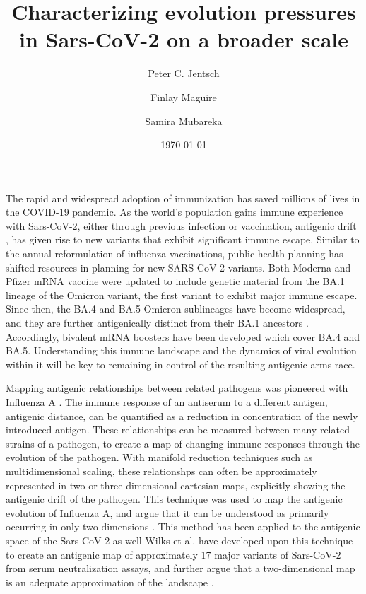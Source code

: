 \documentclass{article}
\title{Characterizing evolution pressures in Sars-CoV-2 on a broader scale}
\author[1,4]{Peter C. Jentsch}
\author[3,5]{Finlay Maguire}
\author[1,2]{Samira Mubareka}
\affil[1]{Sunnybrook Research Institute, Toronto, Canada}
\affil[2]{University of Toronto, Toronto, Canada}
\affil[3]{Dalhousie University, Halifax, Canada}
\affil[4]{Simon Fraser University, Burnaby, Canada}
\affil[5]{Shared Hospital Laboratory, Toronto, Canada}
\date{\today}                     %
\begin{document}
The rapid and widespread adoption of immunization has saved millions of lives in the COVID-19 pandemic.
As the world's population gains immune experience with Sars-CoV-2, either through previous infection or vaccination, antigenic drift \cite{yewdellAntigenicDriftUnderstanding2021}, has given rise to new variants that exhibit significant immune escape.
Similar to the annual reformulation of influenza vaccinations, public health planning has shifted resources in planning for new SARS-CoV-2 variants.
Both Moderna and Pfizer mRNA vaccine were updated to include genetic material from the BA.1 lineage of the Omicron variant, the first variant to exhibit major immune escape.
Since then, the BA.4 and BA.5 Omicron sublineages have become widespread, and they are further antigenically distinct from their BA.1 ancestors \cite{cao2022ba}.
Accordingly, bivalent mRNA boosters have been developed which cover BA.4 and BA.5. 
Understanding this immune landscape and the dynamics of viral evolution within it will be key to remaining in control of the resulting antigenic arms race.


Mapping antigenic relationships between related pathogens was pioneered with Influenza A \cite{lapedesGeometryShapeSpace2001}. 
The immune response of an antiserum to a different antigen, antigenic distance, can be quantified as a reduction in concentration of the newly introduced antigen.
These relationships can be measured between many related strains of a pathogen, to create a map of changing immune responses through the evolution of the pathogen.
With manifold reduction techniques such as multidimensional scaling, these relationshps can often be approximately represented in two or three dimensional cartesian maps, explicitly showing the antigenic drift of the pathogen.
This technique was used to map the antigenic evolution of Influenza A, and argue that it can be understood as primarily occurring in only two dimensions \cite{lapedesGeometryShapeSpace2001, smithMappingAntigenicGenetic2004}.
This method has been applied to the antigenic space of the Sars-CoV-2 as well
Wilks et al. have developed upon this technique to create an antigenic map of approximately 17 major variants of Sars-CoV-2 from serum neutralization assays, and further argue that a two-dimensional map is an adequate approximation of the landscape \cite{millerAntigenicSpaceFramework2021, wilksMappingSARSCoV2Antigenic2022, van2022mapping}. 
\end{document}
